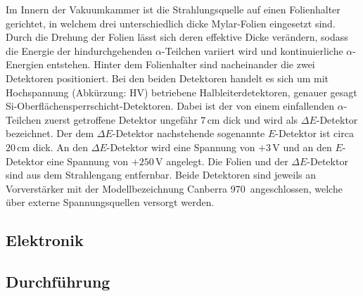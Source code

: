 Im Innern der Vakuumkammer ist die Strahlungsquelle auf einen Folienhalter gerichtet, in welchem drei unterschiedlich dicke Mylar-Folien eingesetzt sind.
Durch die Drehung der Folien lässt sich deren effektive Dicke verändern, sodass die Energie der hindurchgehenden $\alpha$-Teilchen variiert wird und kontinuierliche $\alpha$-Energien entstehen.
Hinter dem Folienhalter sind nacheinander die zwei Detektoren positioniert.
Bei den beiden Detektoren handelt es sich um mit Hochspannung (Abkürzung: HV) betriebene Halbleiterdetektoren, genauer gesagt Si-Oberflächensperrschicht-Detektoren.
Dabei ist der von einem einfallenden $\alpha$-Teilchen zuerst getroffene Detektor ungefähr $7\,$cm dick und wird als $\Delta E$-Detektor bezeichnet.
Der dem $\Delta E$-Detektor nachstehende sogenannte $E$-Detektor ist circa $20\,$cm dick.
An den $\Delta E$-Detektor wird eine Spannung von $+3\,$V und an den $E$-Detektor eine Spannung von $+250\,$V angelegt.
Die Folien und der $\Delta E$-Detektor sind aus dem Strahlengang entfernbar.
Beide Detektoren sind jeweils an Vorverstärker mit der Modellbezeichnung \glqq Canberra 970\grqq\ angeschlossen, welche über externe Spannungsquellen versorgt werden.



\subsection{Elektronik}



\subsection{Durchführung}


